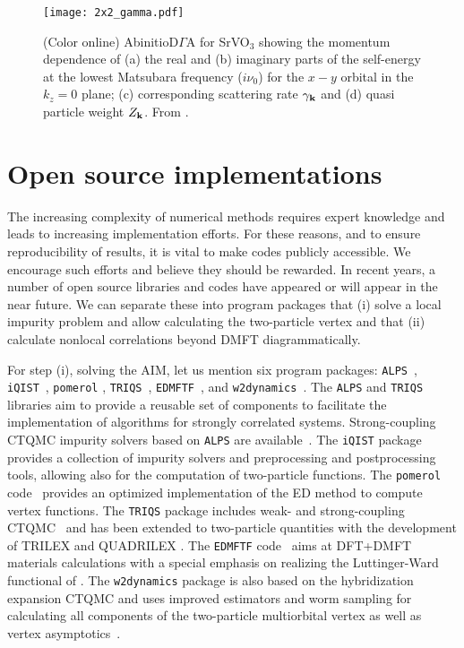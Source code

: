 \documentclass[rmp,aps,reprint,amsmath,amssymb,superscriptaddress,showpacs,nofootinbib]{revtex4-1}
\begin{document}
\begin{figure}[tb]
  \texttt{[image: 2x2\_gamma.pdf]} 
    \caption{(Color online) AbinitioD$\Gamma$A for SrVO$_3$ showing the momentum dependence of  (a)  the real and (b) imaginary parts of the self-energy at the lowest Matsubara frequency ($i\nu_0$) for the $x-y$ orbital in the $k_z=0$ plane; (c) corresponding scattering rate $\gamma_{\bf k}$ and (d) quasi particle weight $Z_{\bf k}$. From .}
  \label{FigDGASrVO3}  
\end{figure}



\section{Open source implementations}
\label{Sec:opensource}

The increasing complexity of numerical methods requires expert knowledge and leads to increasing implementation efforts. For these reasons, and to ensure reproducibility of results, it is vital to make codes publicly accessible. We encourage such efforts and believe they should be rewarded. In recent years, a number of open source libraries and codes have appeared or will appear in the near future. We can separate these into program packages that (i) solve a local impurity problem and allow calculating the two-particle vertex and that (ii) calculate nonlocal correlations beyond DMFT diagrammatically.

For step (i), solving the AIM, let us mention six program packages: {\tt ALPS}~\cite{ALPS2,ALPSCORE}, {\tt iQIST}~\cite{Huang2015},  {\tt pomerol} \cite{Antipov2015a}, {\tt TRIQS}~\cite{TRIQS}, {\tt EDMFTF}~\cite{Haule2007}, and  {\tt w2dynamics}~\cite{w2dynamics,w2dynamics2018}.  The {\tt ALPS} and {\tt TRIQS} libraries aim to provide a reusable set of components to facilitate the implementation of algorithms for strongly correlated systems. Strong-coupling CTQMC impurity solvers based on {\tt ALPS} are available~\cite{Gull2011b,Hafermann2013,Shinaoka2016}. The {\tt iQIST} package~\cite{Huang2015} provides a collection of impurity solvers and preprocessing and postprocessing tools, allowing also for the computation of two-particle functions. The  {\tt pomerol} code~\cite{Antipov2015a} provides an optimized implementation of the ED method to compute vertex functions. The {\tt TRIQS} package includes weak- and strong-coupling CTQMC~\cite{Seth2016} and has been extended to two-particle quantities with the development of TRILEX \cite{Ayral2015,Ayral2016a}  and QUADRILEX \cite{Ayral2016}. The  {\tt EDMFTF} code~\cite{Haule2007} aims at DFT+DMFT materials calculations with a special emphasis on realizing the Luttinger-Ward functional of . The {\tt w2dynamics} package is also based on the hybridization expansion CTQMC and uses improved estimators and worm sampling for calculating all components of the two-particle multiorbital vertex   \cite{Gunacker15,Gunacker2016} as well as vertex asymptotics~\cite{Kaufmann2017}.
\end{document}
